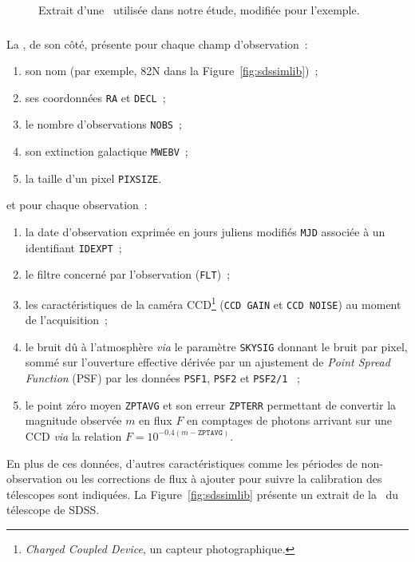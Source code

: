 \documentclass[../main/main.tex]{subfiles}
\begin{document}
\begin{figure}[]
    \centerfloat
        \caption[Extrait d'une \hostlib\ utilisée dans notre étude]{Extrait
        d'une \hostlib\ utilisée dans notre étude, modifiée pour l'exemple.}
    \label{fig:nrenv}
\end{figure}

\subsubsection{\simlib}\label{sssec:simlib}

La \simlib, de son côté, présente pour chaque champ d'observation~:
\begin{enumerate}
    \item son nom (par exemple, 82N dans la Figure~\ref{fig:sdssimlib})~;
    \item ses coordonnées \texttt{RA} et \texttt{DECL}~;
    \item le nombre d'observations \texttt{NOBS}~;
    \item son extinction galactique \texttt{MWEBV}~;
    \item la taille d'un pixel \texttt{PIXSIZE}.
\end{enumerate}
et pour chaque observation~:
\begin{enumerate}[resume]
    \item la date d'observation exprimée en jours juliens modifiés \texttt{MJD}
        associée à un identifiant \texttt{IDEXPT}~;
    \item le filtre concerné par l'observation (\texttt{FLT})~;
    \item les caractéristiques de la caméra CCD\footnote{\textit{Charged Coupled
        Device}, un capteur photographique.} (\texttt{CCD GAIN} et \texttt{CCD
        NOISE}) au moment de l'acquisition~;
    \item le bruit dû à l'atmosphère \textit{via} le paramètre \texttt{SKYSIG}
        donnant le bruit par pixel, sommé sur l'ouverture effective dérivée par
        un ajustement de \textit{Point Spread Function} (PSF) par les données
        \texttt{PSF1}, \texttt{PSF2} et \texttt{PSF2/1} \citep[voir Section~2
        de][pour les détails]{kessler2009a}~;
    \item le point zéro moyen \texttt{ZPTAVG} et son erreur \texttt{ZPTERR}
        permettant de convertir la magnitude observée $m$ en flux $F$ en
        comptages de photons arrivant sur une CCD \textit{via} la relation $F =
        10^{-0.4(m-\texttt{ZPTAVG})}$.
\end{enumerate}
En plus de ces données, d'autres caractéristiques comme les périodes de
non-observation ou les corrections de flux à ajouter pour suivre la calibration
des télescopes sont indiquées. La Figure~\ref{fig:sdssimlib} présente un extrait
de la \simlib\ du télescope de SDSS.
\end{document}
